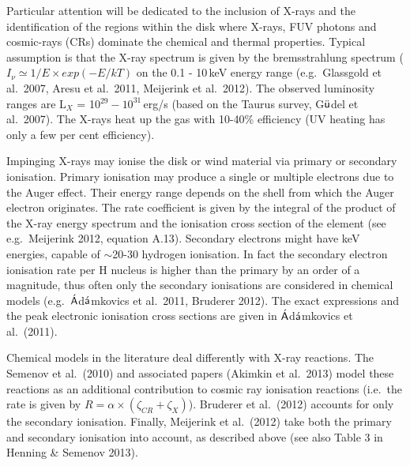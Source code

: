 \documentclass[10pt,fleqn,twoside]{article}
\begin{document}
Particular attention will be dedicated to the inclusion of X-rays and the identification of the regions within the disk where X-rays, FUV photons and cosmic-rays (CRs) dominate the chemical and thermal properties. Typical assumption is that the X-ray spectrum is given by the bremsstrahlung spectrum ($I_{\nu} \simeq 1/E \times exp(-E/kT)$ on the 0.1 - 10\,keV energy range (e.g.\ Glassgold et al.\ 2007, Aresu et al.\ 2011, Meijerink et al.\ 2012). The observed luminosity ranges are L$_X$ = 10$^{29} - 10^{31}$\,erg/s (based on the Taurus survey, G$\ddot{\textsf u}$del et al.\ 2007). The X-rays heat up the gas with 10-40\% efficiency (UV heating has only a few per cent efficiency). 

Impinging X-rays may ionise the disk or wind material via primary or secondary ionisation. Primary ionisation may produce a single or multiple electrons due to the Auger effect. Their energy range depends on the shell from which  the Auger electron originates. The rate coefficient is given by the integral of the product of the X-ray energy spectrum and the ionisation cross section of the element (see e.g.\ Meijerink 2012, equation A.13). Secondary electrons might have keV energies, capable of $\sim$20-30 hydrogen ionisation. In fact the secondary electron ionisation rate per H nucleus is higher than the primary by an order of a magnitude, thus often only the secondary ionisations are considered in chemical models (e.g.\ $\acute{\textsf A}$d$\acute{\textsf a}$mkovics et al.\ 2011, Bruderer 2012).
The exact expressions and the peak electronic ionisation cross sections are given in $\acute{\textsf A}$d$\acute{\textsf a}$mkovics et al.\ (2011). 

Chemical models in the literature deal differently with X-ray reactions. The Semenov et al.\ (2010) and associated papers (Akimkin et al.\ 2013) model these reactions as an additional contribution to cosmic ray ionisation reactions (i.e.\ the rate is given by $R = \alpha \times (\zeta_{CR} + \zeta_X)$). Bruderer et al.\ (2012) accounts for only the secondary ionisation. Finally, Meijerink et al.\ (2012) take both the primary and secondary ionisation into account, as described above (see also Table 3 in Henning \& Semenov 2013).
\end{document}
